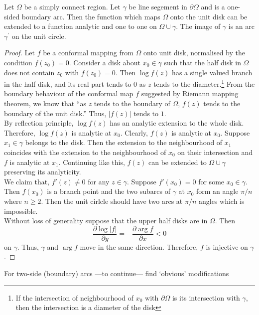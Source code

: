 \begin{theorem}
	Let $\Omega$ be a simply connect region.
	Let $\gamma$ be line segement in $\partial \Omega$ and is a one-sided boundary arc.
	Then the function which maps $\Omega$ onto the unit disk can be extended to a function analytic and one to one on $\Omega \cup \gamma$. The image of $\gamma$ is an arc $\gamma^\prime$ on the unit circle.
\end{theorem}
\begin{proof}
	Let $f$ be a conformal mapping from $\Omega$ onto unit disk, normalised by the condition $f(z_0) = 0$.
	Consider a disk about $x_0 \in \gamma$ such that the half disk in $\Omega$ does not contain $z_0$ with $f(z_0) = 0$.	
	Then $\log f(z)$ has a single valued branch in the half disk, and its real part tends to $0$ as $z$ tends to the diameter.\footnote{If the intersection of neighbourhood of $x_0$ with $\partial \Omega$ is its intersection with $\gamma$, then the intersection is a diameter of the disk}
	From the boundary behaviour of the conformal map $f$ suggested by Riemann mapping theorem, we know that ``as $z$ tends to the boundary of $\Omega$, $f(z)$ tends to the boundary of the unit disk.''
	Thus, $|f(z)|$ tends to $1$.\\

	By reflection principle, $\log f(z)$ has an analytic extension to the whole disk. Therefore, $\log f(z)$ is analytic at $x_0$. Clearly, $f(z)$ is analytic at $x_0$. Suppose $x_1 \in \gamma$ belongs to the disk. Then the extension to the neighbourhood of $x_1$ coincides with the extension to the neighbourhood of $x_0$ on their intersection and $f$ is analytic at $x_1$. Continuing like this, $f(z)$ can be extended to $\Omega \cup \gamma$ preserving its analyticity.\\

	We claim that, $f'(z) \ne 0$ for any $z \in \gamma$. Suppose $f'(x_0) = 0$ for some $x_0 \in \gamma$. Then $f(x_0)$ is a branch point and the two subarcs of $\gamma$ at $x_0$ form an angle $\pi/n$ where $n \ge 2$. Then the unit cirlcle should have two arcs at $\pi/n$ angles which is impossible.\\

	Without loss of generality suppose that the upper half disks are in $\Omega$. Then 
	\[ \frac{\partial \log |f|}{\partial y} = -\frac{\partial \arg f}{\partial x} < 0 \]
	 on $\gamma$. Thus, $\gamma$ and $\arg f$ move in the same direction.
	 Therefore, $f$ is injective on $\gamma$.
\end{proof}
\begin{remark}
	For two-side (boundary) arcs
	---to continue--- find `obvious' modifications
\end{remark}

